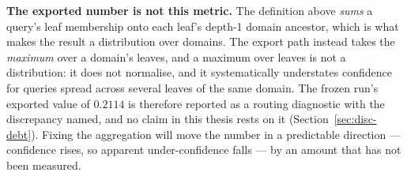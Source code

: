 \textbf{The exported number is not this metric.} The definition above
\emph{sums} a query's leaf membership onto each leaf's depth-1 domain
ancestor, which is what makes the result a distribution over domains.
The export path instead takes the \emph{maximum} over a domain's
leaves, and a maximum over leaves is not a distribution: it does not
normalise, and it systematically understates confidence for queries
spread across several leaves of the same domain. The frozen run's
exported value of $0.2114$ is therefore reported as a routing
diagnostic with the discrepancy named, and no claim in this thesis
rests on it (Section~\ref{sec:disc-debt}). Fixing the aggregation will
move the number in a predictable direction --- confidence rises, so
apparent under-confidence falls --- by an amount that has not been
measured.
